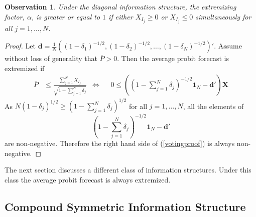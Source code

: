 \documentclass[11pt,twoside]{article}
\newtheorem{observation}[theorem]{Observation}
\theoremstyle{definition}
\theoremstyle{definition}
\begin{document}
\begin{observation}
\label{positiveThmVote}
Under the diagonal information structure, the extremizing factor, $\alpha$, is greater or equal to $1$ if either $X_{I_j} \geq 0$ or  $X_{I_j} \leq 0$ simultaneously for all $j = 1, \dots, N$. 
\end{observation}
\begin{proof} 
Let $\boldsymbol{d} = \frac{1}{N}\left((1-\delta_1)^{-1/2}, (1-\delta_2)^{-1/2}, \dots, (1-\delta_N)^{-1/2}\right)'$. Assume without loss of generality that $\bar{P} > 0$. Then the average probit forecast is extremized if
\begin{align}
 \bar{P}&\leq  \frac{\sum_{j=1}^N X_{I_j}}{\sqrt{1 - \sum_{j=1}^N \delta_j}} &\Leftrightarrow&& 0 \leq  \left(  \left(1 - \sum_{j=1}^N \delta_j \right)^{-1/2} \boldsymbol{1}_N - \boldsymbol{d}' \right) \boldsymbol{X} \label{votingproof}
\end{align}
 As $N (1-\delta_j)^{1/2} \geq \left(1 - \sum_{j=1}^N \delta_j \right)^{1/2}$ for all $j = 1, \dots, N$, all the elements of $$\left(1 - \sum_{j=1}^N \delta_j \right)^{-1/2} \boldsymbol{1}_N - \boldsymbol{d}' $$ are non-negative. Therefore the right hand side of (\ref{votingproof}) is always non-negative. 
\end{proof}
The next section discusses a different class of information structures. Under this class the average probit forecast is always extremized. 

\subsection{Compound Symmetric Information Structure}
\end{document}
